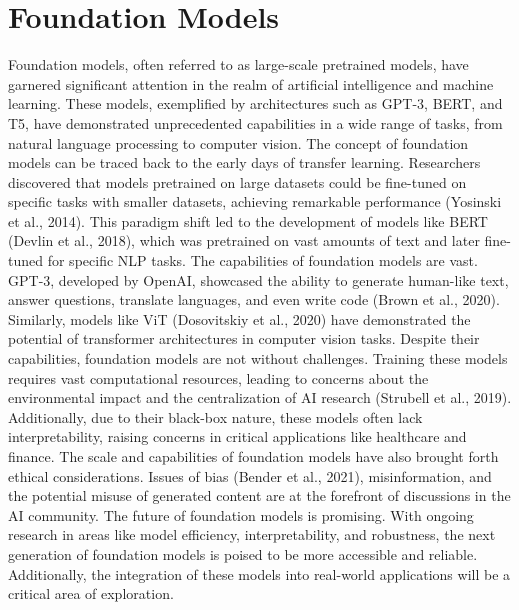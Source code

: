 \documentclass[withindex,glossary,firstyr]{cam-thesis}
\begin{document}


 
\section{Foundation Models}

Foundation models, often referred to as large-scale pretrained models, have garnered significant attention in the realm of artificial intelligence and machine learning. These models, exemplified by architectures such as GPT-3, BERT, and T5, have demonstrated unprecedented capabilities in a wide range of tasks, from natural language processing to computer vision.
The concept of foundation models can be traced back to the early days of transfer learning. Researchers discovered that models pretrained on large datasets could be fine-tuned on specific tasks with smaller datasets, achieving remarkable performance (Yosinski et al., 2014). This paradigm shift led to the development of models like BERT (Devlin et al., 2018), which was pretrained on vast amounts of text and later fine-tuned for specific NLP tasks.
The capabilities of foundation models are vast. GPT-3, developed by OpenAI, showcased the ability to generate human-like text, answer questions, translate languages, and even write code (Brown et al., 2020). Similarly, models like ViT (Dosovitskiy et al., 2020) have demonstrated the potential of transformer architectures in computer vision tasks.
Despite their capabilities, foundation models are not without challenges. Training these models requires vast computational resources, leading to concerns about the environmental impact and the centralization of AI research (Strubell et al., 2019). Additionally, due to their black-box nature, these models often lack interpretability, raising concerns in critical applications like healthcare and finance.
The scale and capabilities of foundation models have also brought forth ethical considerations. Issues of bias (Bender et al., 2021), misinformation, and the potential misuse of generated content are at the forefront of discussions in the AI community.
The future of foundation models is promising. With ongoing research in areas like model efficiency, interpretability, and robustness, the next generation of foundation models is poised to be more accessible and reliable. Additionally, the integration of these models into real-world applications will be a critical area of exploration.
\end{document}
